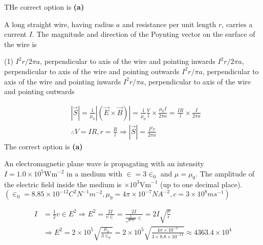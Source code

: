 \begin{enumerate}
\begin{answer}
		THe correct option is \textbf{(a)}	
	\end{answer}
	\begin{minipage}{\textwidth}
		\item A long straight wire, having radius $a$ and resistance per unit length $r$, carries a current $I$. The magnitude and direction of the Poynting vector on the surface of the wire is
	\end{minipage}
	\begin{tasks}(1)
		\task[\textbf{A.}] $I^{2} r / 2 \pi a$, perpendicular to axis of the wire and pointing inwards
		\task[\textbf{B.}]$I^{2} r / 2 \pi a$, perpendicular to axis of the wire and pointing outwards
		\task[\textbf{C.}]$I^{2} r / \pi a$, perpendicular to axis of the wire and pointing inwards
		\task[\textbf{D.}]$I^{2} r / \pi a$, perpendicular to axis of the wire and pointing outwards
	\end{tasks}
	\begin{answer}
		$$\begin{aligned}
		&|\vec{S}|=\frac{1}{\mu_{0}}|(\vec{E} \times \vec{B})|=\frac{1}{\mu_{0}} \frac{V}{l} \times \frac{\mu_{0} I}{2 \pi a}=\frac{I R}{l} \times \frac{I}{2 \pi a} \\
		&\therefore V=I R, r=\frac{R}{l} \Rightarrow|\vec{S}|=\frac{I^{2} r}{2 \pi a}
		\end{aligned}$$
		The correct option is \textbf{(a)}	
	\end{answer}
	\begin{minipage}{\textwidth}
		\item An electromagnetic plane wave is propagating with an intensity $I=1.0 \times 10^{5} \mathrm{Wm}^{-2}$ in a medium with $\in=3 \in_{0}$ and $\mu=\mu_{0}$. The amplitude of the electric field inside the medium is $\times 10^{3} \mathrm{Vm}^{-1}$ (up to one decimal place). $\left(\in_{0}=8.85 \times 10^{-12} C^{2} N^{-1} m^{-2}, \mu_{0}=4 \pi \times 10^{-7} N A^{-2}, c=3 \times 10^{8} m s^{-1}\right)$
	\end{minipage}
	\begin{answer}
		$$\begin{aligned}
		I &=\frac{1}{2} v \in E^{2} \Rightarrow E^{2}=\frac{2 I}{v \in}=\frac{2 I}{\frac{1}{\sqrt{\mu \in}} \in}=2 I \sqrt{\frac{\mu}{\epsilon}} \\
		& \Rightarrow E^{2}=2 \times 10^{5} \sqrt{\frac{\mu_{0}}{3 \in_{0}}}=2 \times 10^{5} \sqrt{\frac{4 \pi \times 10^{-7}}{3 \times 8.8 \times 10^{-12}}} \approx 4363.4 \times 10^{4} \\

\end{aligned}$$
\end{answer}
\end{enumerate}
